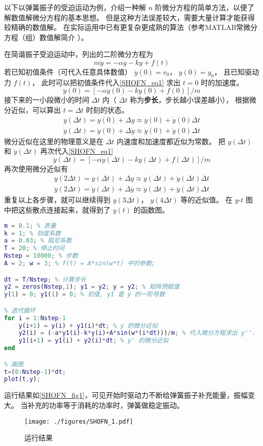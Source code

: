 

以下以弹簧振子的受迫运动为例，介绍一种解 $n$ 阶微分方程的简单方法，以便了解数值解微分方程的基本思想。 但是这种方法误差较大，需要大量计算才能获得较精确的数值解。 在实际运用中已有更复杂更成熟的算法（参考MATLAB常微分方程（组）数值解简介%
）。

在简谐振子受迫运动中，列出的二阶微分方程为
\begin{equation}\label{SHOFN_eq1}
m\ddot y = -\alpha \dot y - ky + f(t)
\end{equation}
若已知初值条件（可代入任意具体数值） $\dot y(0) = v_0$，  $y(0) = y_0$， 且已知驱动力 $f(t)$， 此时可以把初值条件代入\autoref{SHOFN_eq1} 求出 $t = 0$ 时的加速度。
\begin{equation}
\ddot y(0) = [- \alpha \dot y(0) - ky(0) + f(0)]/m
\end{equation}
接下来的一小段微小的时间 $\Delta t$ 内（ $\Delta t$ 称为\textbf{步长}，步长越小误差越小）， 根据微分近似，可以算出 $t = \Delta t$ 时刻的状态。
\begin{gather}
y(\Delta t) =  y(0) + \Delta y \approx y(0) + \dot y(0) \Delta t\\
\dot y(\Delta t) = \dot y(0) + \Delta \dot y \approx \dot y(0) + \ddot y(0) \Delta t
\end{gather}
微分近似在这里的物理意义是在 $\Delta t$ 内速度和加速度都近似为常数。 把 $y(\Delta t)$ 和 $\dot y(\Delta t)$ 再次代入\autoref{SHOFN_eq1}
\begin{equation}
\ddot y(\Delta t) = [- \alpha \dot y(\Delta t) - ky(\Delta t) + f(\Delta t)]/m
\end{equation}
再次使用微分近似有
\begin{gather}
y(2\Delta t) =  y(\Delta t) + \Delta y \approx y(\Delta t) + \dot y(\Delta t) \Delta t\\
\dot y(2\Delta t) = \dot y(\Delta t) + \Delta \dot y \approx \dot y(\Delta t) + \ddot y(\Delta t) \Delta t
\end{gather}
重复以上各步骤，就可以继续得到 $y(3\Delta t)$，  $y(4\Delta t)$ 等的近似值。 在 $y$-$t$ 图中把这些散点连接起来，就得到了 $y(t)$ 的函数图。

\begin{lstlisting}[language=matlab, caption=SHOf.m]
% 参数设定
m = 0.1; % 质量
k = 1; % 劲度系数
a = 0.03; % 阻尼系数
T = 20; % 停止时间
Nstep = 10000; % 步数
A = 2; w = 3; % f(t) = A*sin(w*t) 中的参数;

dt = T/Nstep; % 计算步长
y2 = zeros(Nstep,1); y1 = y2; y = y2; % 矩阵预赋值
y(1) = 0; y1(1) = 0; % 初值, y1 是 y 的一阶导数

% 迭代循环
for i = 1:Nstep-1
    y(i+1) = y(i) + y1(i)*dt; % y 的微分近似
    y2(i) = (-a*y1(i)-k*y(i)+A*sin(w*(i*dt)))/m; % 代入微分方程求出 y''.
    y1(i+1) = y1(i) + y2(i)*dt; % y' 的微分近似
end

% 画图
t=(0:Nstep-1)*dt;
plot(t,y);
\end{lstlisting}

运行结果如\autoref{SHOFN_fig1}，可见开始时驱动力不断给弹簧振子补充能量，振幅变大。 当补充的功率等于消耗的功率时，弹簧做稳定振动。
\begin{figure}[ht]
\centering
\texttt{[image: ./figures/SHOFN\_1.pdf]}
\caption{运行结果}\label{SHOFN_fig1}
\end{figure}

